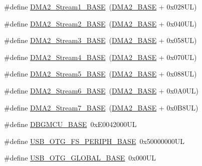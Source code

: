 \begin{DoxyCompactItemize}
\item 
\#define \hyperlink{group___peripheral__memory__map_ga35512bdc3f5e9df4557c2fbe7935d0b1}{D\+M\+A2\+\_\+\+Stream1\+\_\+\+B\+A\+SE}~(\hyperlink{group___peripheral__memory__map_gab72a9ae145053ee13d1d491fb5c1df64}{D\+M\+A2\+\_\+\+B\+A\+SE} + 0x028\+U\+L)
\item 
\#define \hyperlink{group___peripheral__memory__map_gaed33a06f08188466f2ede06160984e9a}{D\+M\+A2\+\_\+\+Stream2\+\_\+\+B\+A\+SE}~(\hyperlink{group___peripheral__memory__map_gab72a9ae145053ee13d1d491fb5c1df64}{D\+M\+A2\+\_\+\+B\+A\+SE} + 0x040\+U\+L)
\item 
\#define \hyperlink{group___peripheral__memory__map_gaf3a9480e08c6ae94f4482e0cdaebdd17}{D\+M\+A2\+\_\+\+Stream3\+\_\+\+B\+A\+SE}~(\hyperlink{group___peripheral__memory__map_gab72a9ae145053ee13d1d491fb5c1df64}{D\+M\+A2\+\_\+\+B\+A\+SE} + 0x058\+U\+L)
\item 
\#define \hyperlink{group___peripheral__memory__map_gad1e67740e6301233473f64638145dd1f}{D\+M\+A2\+\_\+\+Stream4\+\_\+\+B\+A\+SE}~(\hyperlink{group___peripheral__memory__map_gab72a9ae145053ee13d1d491fb5c1df64}{D\+M\+A2\+\_\+\+B\+A\+SE} + 0x070\+U\+L)
\item 
\#define \hyperlink{group___peripheral__memory__map_gaed1460fdc407b6decfbffccb0260d0af}{D\+M\+A2\+\_\+\+Stream5\+\_\+\+B\+A\+SE}~(\hyperlink{group___peripheral__memory__map_gab72a9ae145053ee13d1d491fb5c1df64}{D\+M\+A2\+\_\+\+B\+A\+SE} + 0x088\+U\+L)
\item 
\#define \hyperlink{group___peripheral__memory__map_ga5e81174c96fd204fa7c82c815e85c8e6}{D\+M\+A2\+\_\+\+Stream6\+\_\+\+B\+A\+SE}~(\hyperlink{group___peripheral__memory__map_gab72a9ae145053ee13d1d491fb5c1df64}{D\+M\+A2\+\_\+\+B\+A\+SE} + 0x0\+A0\+U\+L)
\item 
\#define \hyperlink{group___peripheral__memory__map_gaa9faa708ad2440d24eb1064cba9bb06d}{D\+M\+A2\+\_\+\+Stream7\+\_\+\+B\+A\+SE}~(\hyperlink{group___peripheral__memory__map_gab72a9ae145053ee13d1d491fb5c1df64}{D\+M\+A2\+\_\+\+B\+A\+SE} + 0x0\+B8\+U\+L)
\item 
\#define \hyperlink{group___peripheral__memory__map_ga4adaf4fd82ccc3a538f1f27a70cdbbef}{D\+B\+G\+M\+C\+U\+\_\+\+B\+A\+SE}~0x\+E0042000\+UL
\item 
\#define \hyperlink{group___peripheral__memory__map_gaa86d4c80849a74938924e73937b904e7}{U\+S\+B\+\_\+\+O\+T\+G\+\_\+\+F\+S\+\_\+\+P\+E\+R\+I\+P\+H\+\_\+\+B\+A\+SE}~0x50000000\+UL
\item 
\#define \hyperlink{group___peripheral__memory__map_ga044aa4388e72d9d47a03f387fb8926fb}{U\+S\+B\+\_\+\+O\+T\+G\+\_\+\+G\+L\+O\+B\+A\+L\+\_\+\+B\+A\+SE}~0x000\+UL

\end{DoxyCompactItemize}
